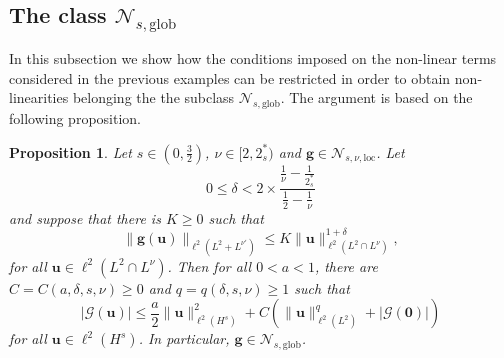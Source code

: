 \documentclass[12pt,a4paper]{amsart}
\newtheorem{prop}[theorem]{Proposition}
\numberwithin{equation}{section}
\newcommand{\ulu}{\boldsymbol{u}}
\newcommand{\ulg}{\boldsymbol{g}}
\newcommand{\twoasts}{{2^*_s}}
\newcommand{\Nlocnu}{\mathscr{N}_{s,\nu,\mathrm{loc}}}
\newcommand{\Nglob}{\mathscr{N}_{s,\mathrm{glob}}}
\begin{document}
	\subsection{The class \texorpdfstring{$\Nglob$}{Nglob}}\label{subsec:Nglob}
	In this subsection we show how the conditions imposed on the non-linear terms considered in the previous examples can be restricted in order to obtain non-linearities belonging the the subclass $\Nglob$. The argument is based on the following proposition.
	
	\begin{prop}\label{lem:global_ex_estim}
		Let $s\in(0,\frac32)$, $\nu\in[2,2_s^*)$ and $\ulg\in\Nlocnu$. 
		Let
		\begin{equation}\label{eq:cond-delta}
			0\le\delta<2\times\frac{\frac1\nu-\frac1{2_s^*}}{\frac12-\frac1\nu}
		\end{equation}
		and suppose that there is $K\ge0$ such that
		\begin{equation}\label{est:nonlinearity_global_estimate} 
			\| \ulg (\ulu) \|_{\ell^2(L^2+ L^{\nu'})} \leq K \| \ulu \|_{\ell^2(L^2\cap L^\nu)}^{1+\delta},
		\end{equation}
		for all $\ulu\in \ell^2(L^2\cap L^\nu)$. 
		Then for all $0<a<1$, there are $C=C(a,\delta,s,\nu)\ge0$ and $q=q(\delta,s,\nu)\ge1$ such that 
		\begin{equation}
			|\mathscr{G}(\ulu)|  \leq \frac{a}{2} \| \ulu  \|_{\ell^2(H^{s})}^2 + C  ( \| \ulu  \|_{\ell^2(L^2)}^{q} + | \mathscr{G}(\boldsymbol{0}) | )
		\end{equation}
		for all $\ulu\in \ell^2(H^s)$. In particular, $\ulg\in\Nglob$. %
	\end{prop}
	
	
	
\end{document}

